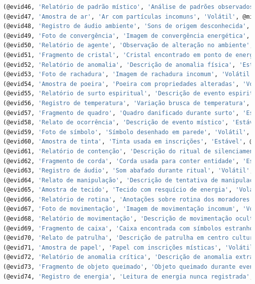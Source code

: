 \documentclass[12pt,a4paper]{report}
\begin{document}
\begin{lstlisting}[language=SQL, caption=population.sql]
(@evid46, 'Relatório de padrão místico', 'Análise de padrões observados', 'Estável', @miss10),
(@evid47, 'Amostra de ar', 'Ar com partículas incomuns', 'Volátil', @miss10),
(@evid48, 'Registro de áudio ambiente', 'Sons de origem desconhecida', 'Volátil', @miss10),
(@evid49, 'Foto de convergência', 'Imagem de convergência energética', 'Estável', @miss11),
(@evid50, 'Relatório de agente', 'Observação de alteração no ambiente', 'Estável', @miss11),
(@evid51, 'Fragmento de cristal', 'Cristal encontrado em ponto de energia', 'Estável', @miss11),
(@evid52, 'Relatório de anomalia', 'Descrição de anomalia física', 'Estável', @miss12),
(@evid53, 'Foto de rachadura', 'Imagem de rachadura incomum', 'Volátil', @miss12),
(@evid54, 'Amostra de poeira', 'Poeira com propriedades alteradas', 'Volátil', @miss12),
(@evid55, 'Relatório de surto espiritual', 'Descrição de evento espiritual', 'Estável', @miss13),
(@evid56, 'Registro de temperatura', 'Variação brusca de temperatura', 'Volátil', @miss13),
(@evid57, 'Fragmento de quadro', 'Quadro danificado durante surto', 'Estável', @miss13),
(@evid58, 'Relato de ocorrência', 'Descrição de evento místico', 'Estável', @miss14),
(@evid59, 'Foto de símbolo', 'Símbolo desenhado em parede', 'Volátil', @miss14),
(@evid60, 'Amostra de tinta', 'Tinta usada em inscrições', 'Estável', @miss14),
(@evid61, 'Relatório de contenção', 'Descrição do ritual de silenciamento', 'Estável', @miss15),
(@evid62, 'Fragmento de corda', 'Corda usada para conter entidade', 'Estável', @miss15),
(@evid63, 'Registro de áudio', 'Som abafado durante ritual', 'Volátil', @miss15),
(@evid64, 'Relato de manipulação', 'Descrição de tentativa de manipulação psíquica', 'Estável', @miss16),
(@evid65, 'Amostra de tecido', 'Tecido com resquício de energia', 'Volátil', @miss16),
(@evid66, 'Relatório de rotina', 'Anotações sobre rotina dos moradores', 'Estável', @miss17),
(@evid67, 'Foto de movimentação', 'Imagem de movimentação incomum', 'Volátil', @miss17),
(@evid68, 'Relatório de movimentação', 'Descrição de movimentação oculta', 'Estável', @miss18),
(@evid69, 'Fragmento de caixa', 'Caixa encontrada com símbolos estranhos', 'Volátil', @miss18),
(@evid70, 'Relato de patrulha', 'Descrição de patrulha em centro cultural', 'Estável', @miss19),
(@evid71, 'Amostra de papel', 'Papel com inscrições místicas', 'Volátil', @miss19),
(@evid72, 'Relatório de anomalia crítica', 'Descrição de anomalia extraplanar', 'Perigoso', @miss20),
(@evid73, 'Fragmento de objeto queimado', 'Objeto queimado durante evento crítico', 'Volátil', @miss20),
(@evid74, 'Registro de energia', 'Leitura de energia nunca registrada', 'Perigoso', @miss20);



\end{lstlisting}
\end{document}
